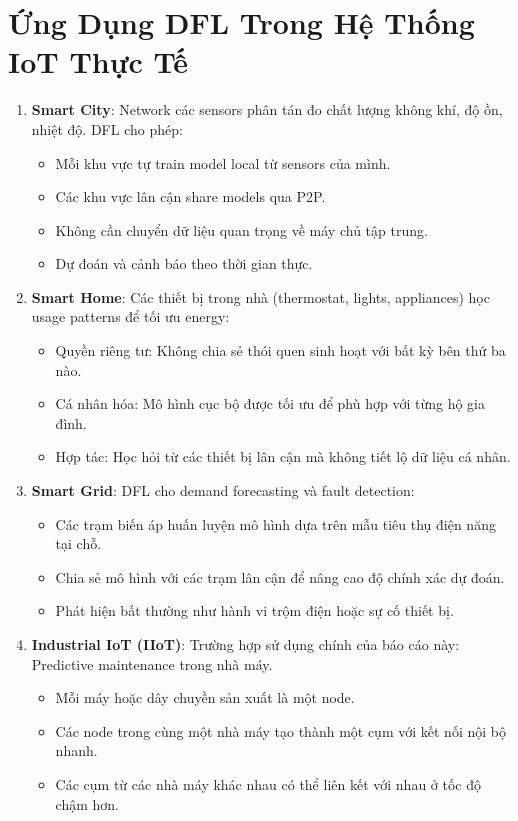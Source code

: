 \section{Ứng Dụng DFL Trong Hệ Thống IoT Thực Tế}
\begin{enumerate}
    \item \textbf{Smart City}: Network các sensors phân tán đo chất lượng không khí,
độ ồn, nhiệt độ. DFL cho phép:
    \begin{itemize}
    \item Mỗi khu vực tự train model local từ sensors của mình.
    \item Các khu vực lân cận share models qua P2P.
    \item Không cần chuyển dữ liệu quan trọng về máy chủ tập trung.
    \item Dự đoán và cảnh báo theo thời gian thực.
\end{itemize}

    \item \textbf{Smart Home}: Các thiết bị trong nhà (thermostat, lights, appliances) học usage patterns để tối ưu energy:
    \begin{itemize}
    \item Quyền riêng tư: Không chia sẻ thói quen sinh hoạt với bất kỳ bên thứ ba nào.
    \item Cá nhân hóa: Mô hình cục bộ được tối ưu để phù hợp với từng hộ gia đình.
    \item Hợp tác: Học hỏi từ các thiết bị lân cận mà không tiết lộ dữ liệu cá nhân.
\end{itemize}

    \item \textbf{Smart Grid}: DFL cho demand forecasting và fault detection:
    \begin{itemize}
    \item Các trạm biến áp huấn luyện mô hình dựa trên mẫu tiêu thụ điện năng tại chỗ.
    \item Chia sẻ mô hình với các trạm lân cận để nâng cao độ chính xác dự đoán.
    \item Phát hiện bất thường như hành vi trộm điện hoặc sự cố thiết bị.
\end{itemize}

    \item \textbf{Industrial IoT (IIoT)}: Trường hợp sử dụng chính của báo cáo này: Predictive maintenance trong nhà máy.
    \begin{itemize}
    \item Mỗi máy hoặc dây chuyền sản xuất là một node.
    \item Các node trong cùng một nhà máy tạo thành một cụm với kết nối nội bộ nhanh.
    \item Các cụm từ các nhà máy khác nhau có thể liên kết với nhau ở tốc độ chậm hơn.
\end{itemize}


\end{enumerate}

